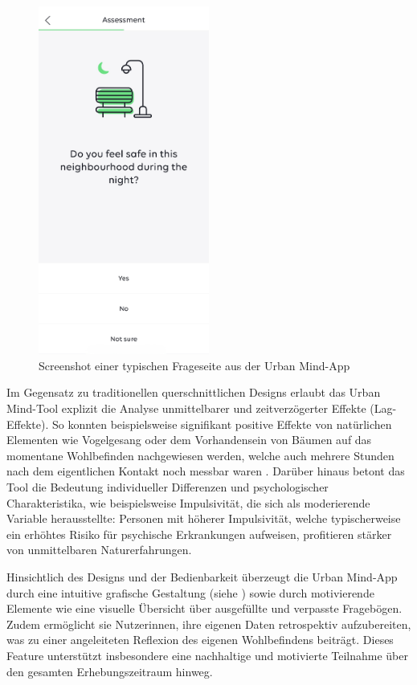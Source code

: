 \begin{figure}[htbp]
    \centering
    \includegraphics[width=0.5\textwidth]{Arbeit/images/urban_mind01.jpeg}
    \caption{Screenshot einer typischen Frageseite aus der Urban Mind-App}
    \label{fig:urban_mind_screenshot_1}
\end{figure}

Im Gegensatz zu traditionellen querschnittlichen Designs erlaubt das Urban Mind-Tool explizit die Analyse unmittelbarer und zeitverzögerter Effekte (Lag-Effekte). So konnten beispielsweise signifikant positive Effekte von natürlichen Elementen wie Vogelgesang oder dem Vorhandensein von Bäumen auf das momentane Wohlbefinden nachgewiesen werden, welche auch mehrere Stunden nach dem eigentlichen Kontakt noch messbar waren \parencite{bakolisUrbanMindUsing2018}. Darüber hinaus betont das Tool die Bedeutung individueller Differenzen und psychologischer Charakteristika, wie beispielsweise Impulsivität, die sich als moderierende Variable herausstellte: Personen mit höherer Impulsivität, welche typischerweise ein erhöhtes Risiko für psychische Erkrankungen aufweisen, profitieren stärker von unmittelbaren Naturerfahrungen.

Hinsichtlich des Designs und der Bedienbarkeit überzeugt die Urban Mind-App durch eine intuitive grafische Gestaltung (siehe ) sowie durch motivierende Elemente wie eine visuelle Übersicht über ausgefüllte und verpasste Fragebögen. Zudem ermöglicht sie Nutzer\genderstern innen, ihre eigenen Daten retrospektiv aufzubereiten, was zu einer angeleiteten Reflexion des eigenen Wohlbefindens beiträgt. Dieses Feature unterstützt insbesondere eine nachhaltige und motivierte Teilnahme über den gesamten Erhebungszeitraum hinweg.

